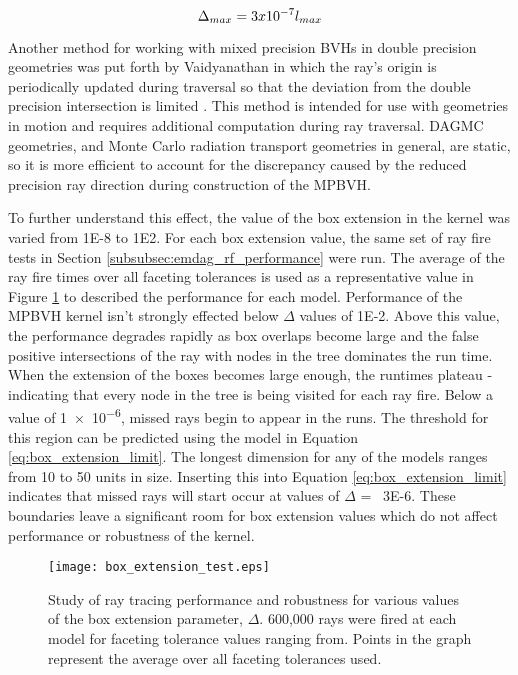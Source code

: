 \begin{equation}
  \centering
  \Delta_{max} = 3 x 10^{-7} l_{max}
  \label{eq:box_extension_limit}
\end{equation}

Another method for working with mixed precision BVHs in double precision
geometries was put forth by Vaidyanathan in which the ray's origin is
periodically updated during traversal so that the deviation from the double
precision intersection is limited \cite{Vaidyanathan_2016}. This method is
intended for use with geometries in motion and requires additional computation
during ray traversal. DAGMC geometries, and Monte Carlo radiation transport
geometries in general, are static, so it is more efficient to account for the
discrepancy caused by the reduced precision ray direction during construction of
the MPBVH.

To further understand this effect, the value of the box extension in the kernel
was varied from \num{1E-8} to \num{1E2}. For each box extension value, the same
set of ray fire tests in Section \ref{subsubsec:emdag_rf_performance} were
run. The average of the ray fire times over all faceting tolerances is used as a
representative value in Figure \ref{fig:box_bump_tests} to described the
performance for each model. Performance of the MPBVH kernel isn't strongly
effected below $\Delta$ values of \num{1E-2}. Above this value, the performance
degrades rapidly as box overlaps become large and the false positive
intersections of the ray with nodes in the tree dominates the run time. When the
extension of the boxes becomes large enough, the runtimes plateau - indicating
that every node in the tree is being visited for each ray fire. Below a value of
\num{1e-6}, missed rays begin to appear in the runs. The threshold for this
region can be predicted using the model in Equation
\ref{eq:box_extension_limit}. The longest dimension for any of the models ranges
from 10 to 50 units in size. Inserting this into Equation
\ref{eq:box_extension_limit} indicates that missed rays will start occur at
values of $\Delta$ = ~\num{3E-6}. These boundaries leave a significant room for
box extension values which do not affect performance or robustness of the
kernel.

\begin{figure}[H]
  \centering
  \texttt{[image: box\_extension\_test.eps]}
  \caption{Study of ray tracing performance and robustness for various values of
    the box extension parameter, $\Delta$. 600,000 rays were fired at each model
    for faceting tolerance values ranging from. Points in the graph represent
    the average over all faceting tolerances used.}
  \label{fig:box_bump_tests}
\end{figure}


